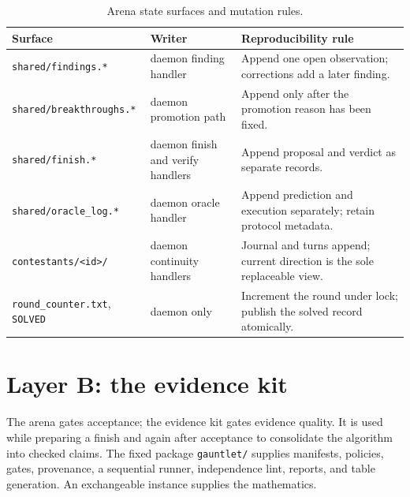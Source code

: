 \documentclass[11pt]{article}
\newcommand{\code}[1]{\texttt{#1}}
\begin{document}
\begin{table}[htbp]
\centering
\small
\caption{Arena state surfaces and mutation rules.}
\label{tab:arena-state}
\begin{tabularx}{\textwidth}{@{}
  >{\raggedright\arraybackslash}p{}
  >{\raggedright\arraybackslash}p{}Y@{}}
\toprule
Surface & Writer & Reproducibility rule \\
\midrule
\code{shared/findings.*} &
daemon finding handler &
Append one open observation; corrections add a later finding. \\
\code{shared/breakthroughs.*} &
daemon promotion path &
Append only after the promotion reason has been fixed. \\
\code{shared/finish.*} &
daemon finish and verify handlers &
Append proposal and verdict as separate records. \\
\code{shared/oracle\_log.*} &
daemon oracle handler &
Append prediction and execution separately; retain protocol metadata. \\
\code{contestants/<id>/} &
daemon continuity handlers &
Journal and turns append; current direction is the sole replaceable view. \\
\code{round\_counter.txt}, \code{SOLVED} &
daemon only &
Increment the round under lock; publish the solved record atomically. \\
\bottomrule
\end{tabularx}
\end{table}

\clearpage

\section{Layer B: the evidence kit}

The arena gates acceptance; the evidence kit gates evidence quality.  It is
used while preparing a finish and again after acceptance to consolidate the
algorithm into checked claims.  The fixed package \code{gauntlet/} supplies
manifests, policies, gates, provenance, a sequential runner, independence
lint, reports, and table generation.  An exchangeable instance supplies the
mathematics.
\end{document}

